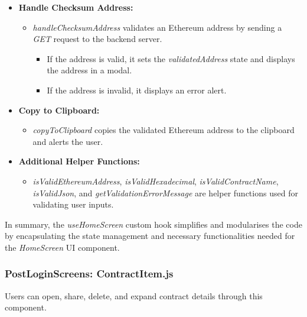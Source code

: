 \begin{itemize}
    \item \textbf{Handle Checksum Address:}
    \begin{itemize}
        \item \textit{handleChecksumAddress} validates an Ethereum address by sending a \textit{GET} request to the backend server.
        \begin{itemize}
            \item If the address is valid, it sets the \textit{validatedAddress} state and displays the address in a modal.
            \item If the address is invalid, it displays an error alert.
        \end{itemize}
    \end{itemize}

    \item \textbf{Copy to Clipboard:}
    \begin{itemize}
        \item \textit{copyToClipboard} copies the validated Ethereum address to the clipboard and alerts the user.
    \end{itemize}

    \item \textbf{Additional Helper Functions:}
    \begin{itemize}
        \item \textit{isValidEthereumAddress}, \textit{isValidHexadecimal}, \textit{isValidContractName}, \textit{isValidJson}, and \textit{getValidationErrorMessage} are helper functions used for validating user inputs.
    \end{itemize}
\end{itemize}

In summary, the \textit{useHomeScreen} custom hook simplifies and modularises the code by encapsulating the state management and necessary functionalities needed for the \textit{HomeScreen} UI component.

\subsubsection{PostLoginScreens: ContractItem.js}

Users can open, share, delete, and expand contract details through this component. 

